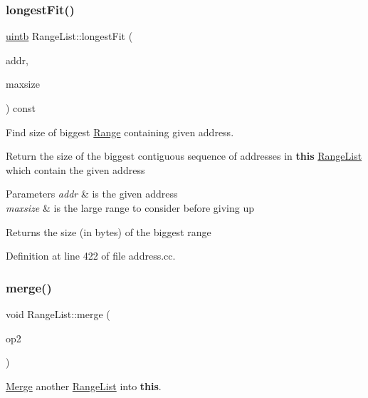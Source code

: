 \subsubsection{\texorpdfstring{longestFit()}{longestFit()}}
{\footnotesize\ttfamily \mbox{\hyperlink{types_8h_a2db313c5d32a12b01d26ac9b3bca178f}{uintb}} Range\+List\+::longest\+Fit (\begin{DoxyParamCaption}\item[{const \mbox{\hyperlink{class_address}{Address}} \&}]{addr,  }\item[{\mbox{\hyperlink{types_8h_a2db313c5d32a12b01d26ac9b3bca178f}{uintb}}}]{maxsize }\end{DoxyParamCaption}) const}



Find size of biggest \mbox{\hyperlink{class_range}{Range}} containing given address. 

Return the size of the biggest contiguous sequence of addresses in {\bfseries{this}} \mbox{\hyperlink{class_range_list}{Range\+List}} which contain the given address 
\begin{DoxyParams}{Parameters}
{\em addr} & is the given address \\
\hline
{\em maxsize} & is the large range to consider before giving up \\
\hline
\end{DoxyParams}
\begin{DoxyReturn}{Returns}
the size (in bytes) of the biggest range 
\end{DoxyReturn}


Definition at line 422 of file address.\+cc.

\mbox{\label{class_range_list_abdacecedb9b17b6a1b67f3f3d1d192e2}} 
\subsubsection{\texorpdfstring{merge()}{merge()}}
{\footnotesize\ttfamily void Range\+List\+::merge (\begin{DoxyParamCaption}\item[{const \mbox{\hyperlink{class_range_list}{Range\+List}} \&}]{op2 }\end{DoxyParamCaption})}



\mbox{\hyperlink{class_merge}{Merge}} another \mbox{\hyperlink{class_range_list}{Range\+List}} into {\bfseries{this}}. 




